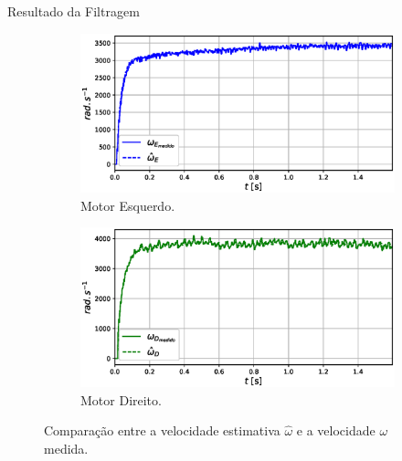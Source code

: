 \begin{frame}{Resultado da Filtragem}

    \begin{figure}
        \begin{subfigure}{.48\textwidth}
            \centering
            \includegraphics[width=1.15\textwidth]{figuras/resultados/exp04/filtro_vs_sem_filtro_esquerdo100.eps}
            \caption{Motor Esquerdo.}
        \end{subfigure}
        \begin{subfigure}{.48\textwidth}
            \centering
            \includegraphics[width=1.15\textwidth]{figuras/resultados/exp04/filtro_vs_sem_filtro_direito100.eps}
            \caption{Motor Direito.}
        \end{subfigure}
        \caption{Comparação entre a velocidade estimativa $\hat{\omega}$ e a velocidade $\omega$ medida.}
    \end{figure}
    
\end{frame}

